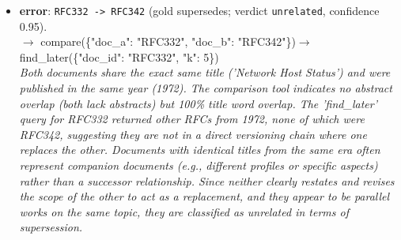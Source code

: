 \begin{itemize}
\item \textbf{error}: \texttt{RFC332 -> RFC342} (gold supersedes; verdict \texttt{unrelated}, confidence 0.95).\\ {\small\ttfamily $\rightarrow$ compare(\{"doc\_a": "RFC332", "doc\_b": "RFC342"\})\newline $\rightarrow$ find\_later(\{"doc\_id": "RFC332", "k": 5\})}\\ \emph{Both documents share the exact same title ('Network Host Status') and were published in the same year (1972). The comparison tool indicates no abstract overlap (both lack abstracts) but 100\% title word overlap. The 'find\_later' query for RFC332 returned other RFCs from 1972, none of which were RFC342, suggesting they are not in a direct versioning chain where one replaces the other. Documents with identical titles from the same era often represent companion documents (e.g., different profiles or specific aspects) rather than a successor relationship. Since neither clearly restates and revises the scope of the other to act as a replacement, and they appear to be parallel works on the same topic, they are classified as unrelated in terms of supersession.}
\end{itemize}

